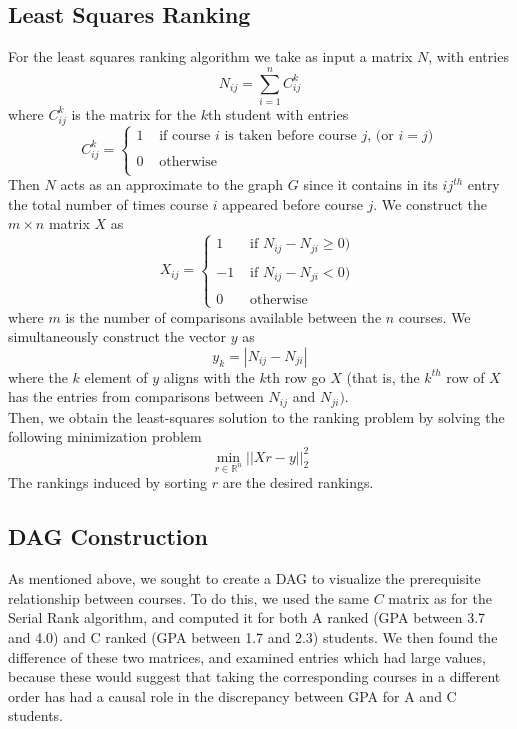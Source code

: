 \documentclass[10pt]{siamltex}
\begin{document}
\begin{pagewiselinenumbers}
\subsection{Least Squares Ranking}
For the least squares ranking algorithm we take as input a matrix $N$, with entries $$N_{ij} = \sum_{i = 1}^n C^k_{ij}$$
where $C^k_{ij}$ is the matrix for the $k$th student with entries
\begin{equation}
C^k_{ij} = \left\{
	\begin{array}{rl}
 1 & \text{ if course $i$ is taken before course $j$, (or $i=j$)} 	\\
 &  \\
 0 & \text{ otherwise }	\\
     \end{array}
   \right.
\label{comparisonMatrix2}
\end{equation}
Then $N$ acts as an approximate to the graph $G$ since it contains in its $ij^{th}$ entry the total number of times course $i$ appeared before course $j$. We construct the $m \times n$ matrix $X$ as
\begin{equation}
X_{ij} = \left\{
	\begin{array}{rl}
 1 & \text{ if $N_{ij} - N_{ji} \geq 0$)} 	\\
 &  \\
 -1 & \text{ if $N_{ij} - N_{ji} < 0$) }	\\
& \\
0 & \text{ otherwise}
     \end{array}
   \right.
\label{comparisonMatrix3}
\end{equation}
where $m$ is the number of comparisons available between the $n$ courses. We simultaneously construct the vector $y$ as 
$$y_k = \left|N_{ij} - N_{ji}\right|$$
where the $k$ element of $y$ aligns with the $k$th row go $X$ (that is, the $k^{th}$ row of $X$ has the entries from comparisons between $N_{ij}$ and $N_{ji})$.\\
Then, we obtain the least-squares solution to the ranking problem by solving the following minimization problem $$\min_{r \in \mathbb{R}^n} ||Xr - y||_2^2$$
The rankings induced by sorting $r$ are the desired rankings.
\subsection{DAG Construction}
As mentioned above, we sought to create a DAG to visualize the prerequisite relationship between courses. To do this, we used the same $C$ matrix as for the Serial Rank algorithm, and computed it for both A ranked (GPA between 3.7 and 4.0) and C ranked (GPA between 1.7 and 2.3) students. We then found the difference of these two matrices, and examined entries which had large values, because these would suggest that taking the corresponding courses in a different order has had a causal role in the discrepancy between GPA for A and C students.


\end{pagewiselinenumbers}
\end{document}
